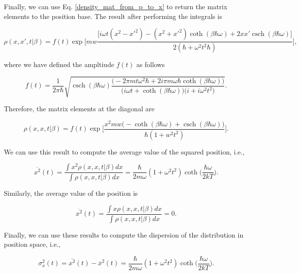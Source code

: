 \documentclass{article}
\DeclareMathOperator{\csch}{csch}
\begin{document}
Finally, we can use Eq. \ref{density_mat_from_p_to_x} to return the matrix elements to the position base. The result after performing the integrals is

\begin{equation}
    \rho(x, x', t|\beta) = f(t) \exp \Bigg[ mw \frac{\big[ i\omega t(x^{2}-x'^{2})-(x^{2}+x'^{2})\coth(\beta \hbar \omega) + 2xx' \csch(\beta \hbar \omega) \big]}{2(\hbar + \omega^{2}t^{2}\hbar)} \Bigg],
\end{equation}

where we have defined the ampltiude $f(t)$ as follows

\begin{equation}
    f(t)=\frac{1}{2\pi \hbar} \sqrt{ \csch(\beta \hbar \omega) \frac{\big(-2\pi m t \omega^{2} \hbar + 2i\pi m \omega \hbar \coth(\beta \hbar \omega)\big)}{\big( i\omega t + \coth(\beta \hbar \omega) \big) \big( i + i\omega^{2} t^{2} \big)}}.
\end{equation}

Therefore, the matrix elements at the diagonal are

\begin{equation}
    \rho(x, x, t|\beta) = f(t) \exp \bigg[\frac{x^{2}mw \big( -\coth(\beta \hbar \omega) + \csch(\beta \hbar \omega) \big)}{\hbar (1+w^{2}t^{2})} \bigg].
\end{equation}

We can use this result to compute the average value of the squared position, i.e.,

\begin{equation}
    \overline{x^{2}} (t)= \frac{\int x^{2} \rho(x,x,t|\beta) dx}{\int \rho(x,x,t|\beta) dx} =  \frac{\hbar}{2m\omega}(1+\omega^{2}t^{2})\coth \bigg( \frac{\hbar \omega}{2 k T} \bigg).
\end{equation}

Similarly, the average value of the position is

\begin{equation}
    \overline{x^{2}} (t)= \frac{\int x \rho(x,x,t|\beta) dx}{\int \rho(x,x,t|\beta) dx} =  0.
\end{equation}

Finally, we can use these results to compute the dispersion of the distribution in position space, i.e.,

\begin{equation}\label{atomic_dispersion_no_gravity}
    \sigma_{x}^{2} (t)= \overline{x^{2}}(t) - \overline{x}^{2}(t) = \frac{\hbar}{2m\omega}(1+\omega^{2}t^{2})\coth\bigg( \frac{\hbar \omega}{2kT} \bigg).
\end{equation}
\end{document}
